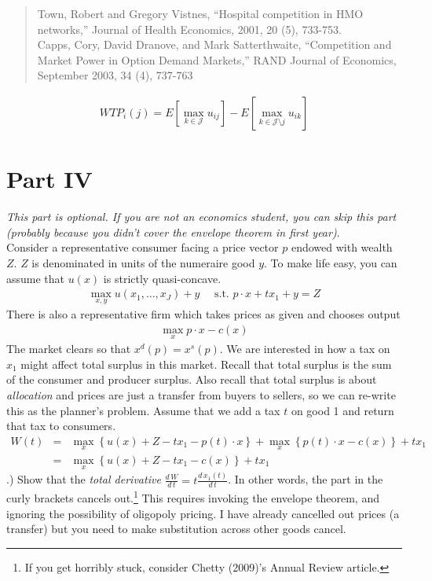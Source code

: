 \documentclass[12pt]{article}
\begin{document}
\begin{quote}
Town, Robert and Gregory Vistnes, ``Hospital competition in HMO networks,'' Journal of
Health Economics, 2001, 20 (5), 733-753.\\

Capps, Cory, David Dranove, and Mark Satterthwaite, ``Competition and Market Power in Option Demand Markets,'' 
RAND Journal of Economics, September 2003, 34 (4), 737-763
\end{quote}

\begin{align*}
WTP_i(j) = E[ \max_{k \in \mathcal{J}} u_{ij}] - E[ \max_{k \in \mathcal{J} \setminus j} u_{ik}]
\end{align*}


\section*{\normalsize Part IV}
\textit{This part is optional. If you are not an economics student, you can skip this part (probably because you didn't cover the envelope theorem in first year)}.\\



\noindent Consider a representative consumer facing a price vector $p$ endowed with wealth $Z$. $Z$ is denominated in units of the numeraire good $y$. To make life easy, you can assume that $u(x)$ is strictly quasi-concave.
\begin{eqnarray*}
\max_{x,y} u(x_1,\ldots,x_J) + y \quad \mbox{ s.t. } p \cdot x + t x_1 + y = Z
\end{eqnarray*}
There is also a representative firm which takes prices as given and chooses output
\begin{eqnarray*}
\max_x p \cdot x - c(x)
\end{eqnarray*}
The market clears so that $x^d(p) = x^s(p)$. We are interested in how a tax on $x_1$ might affect total surplus in this market. Recall that total surplus is the sum of the consumer and producer surplus. Also recall that total surplus is about \textit{allocation} and prices are just a transfer from buyers to sellers, so we can re-write this as the planner's problem. Assume that we add a tax $t$ on good 1 and return that tax to consumers.
\begin{eqnarray*}
W(t) &=& \max_x \left\{  u(x) + Z - t x_1 - p(t) \cdot x \right\}  + \max_x \left\{  p(t) \cdot x - c(x)\right\} + t x_1\\
&=& \max_x \left\{  u(x) + Z - t x_1  - c(x)\right\} + t x_1
\end{eqnarray*}
.) Show that the \textit{total derivative} $\frac{d\, W}{d\, t} = t \frac{d\, x_1(t)}{d\, t}$. In other words, the part in the curly brackets cancels out.\footnote{If you get horribly stuck, consider Chetty (2009)'s Annual Review article.} This requires invoking the envelope theorem, and ignoring the possibility of oligopoly pricing. I have already cancelled out prices (a transfer) but you need to make substitution across other goods cancel.\\
\end{document}
